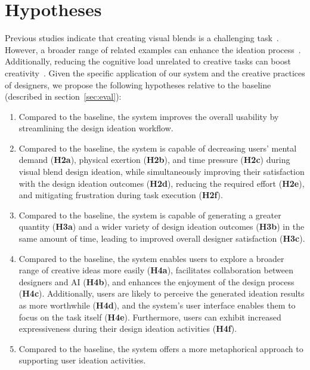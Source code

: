 \section{Hypotheses}



Previous studies indicate that creating visual blends is a challenging task~\cite{10.1145/3290605.3300402, 10.1145/3411764.3445089}. 
However, a broader range of related examples can enhance the ideation process~\cite{ECKERT2000523}. 
Additionally, reducing the cognitive load unrelated to creative tasks can boost creativity~\cite{malycha2017enhancing}.
Given the specific application of our system and the creative practices of designers, we propose the following hypotheses relative to the baseline (described in section~\ref{sec:eval}):


\begin{enumerate}[leftmargin=*, label=\textbf{H\arabic*}]
    \item Compared to the baseline, the \sysname{} system improves the overall usability by streamlining the design ideation workflow.
    \item Compared to the baseline, the \sysname{} system is capable of decreasing users' mental demand  (\textbf{H2a}), physical exertion (\textbf{H2b}), and time pressure (\textbf{H2c}) during visual blend design ideation, while simultaneously improving their satisfaction with the design ideation outcomes (\textbf{H2d}), reducing the required effort (\textbf{H2e}), and mitigating frustration during task execution (\textbf{H2f}).
    \item Compared to the baseline, the \sysname{} system is capable of generating a greater quantity (\textbf{H3a}) and a wider variety of design ideation outcomes (\textbf{H3b}) in the same amount of time, leading to improved overall designer satisfaction (\textbf{H3c}).
    \item Compared to the baseline, the \sysname{} system enables users to explore a broader range of creative ideas more easily (\textbf{H4a}), facilitates collaboration between designers and AI (\textbf{H4b}), and enhances the enjoyment of the design process (\textbf{H4c}). Additionally, users are likely to perceive the generated ideation results as more worthwhile (\textbf{H4d}), and the system's user interface enables them to focus on the task itself (\textbf{H4e}). 
    Furthermore, users can exhibit increased expressiveness during their design ideation activities (\textbf{H4f}). 
    \item Compared to the baseline, the \sysname{} system offers a more metaphorical approach to supporting user ideation activities.
\end{enumerate}

